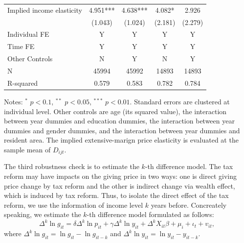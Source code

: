 \documentclass[
  11pt,
  a4paper,
]{article}
\begin{document}
\begin{table}
\begin{threeparttable}
\begin{tabular}[t]{lcccc}
  \hspace{1em}Implied income elasticity & 4.951*** & 4.638*** & 4.082* & 2.926\\
  \hspace{1em} & (1.043) & (1.024) & (2.181) & (2.279)\\
  \hspace{1em}Individual FE & Y & Y & Y & Y\\
  \hspace{1em}Time FE & Y & Y & Y & Y\\
  \hspace{1em}Other Controls & N & Y & N & Y\\
  \hspace{1em}N & 45994 & 45992 & 14893 & 14893\\
  \hspace{1em}R-squared & 0.579 & 0.583 & 0.782 & 0.784\\
  \bottomrule
  \end{tabular}
  \begin{tablenotes}
  \item Notes: $^{*}$ $p < 0.1$, $^{**}$ $p < 0.05$, $^{***}$ $p < 0.01$. Standard errors are clustered at individual level. Other controls are age (its squared value), the interaction between year dummies and education dummies, the interaction between year dummies and gender dummies, and the interaction between year dummies and resident area. The implied extensive-marign price elasticity is evaluated at the sample mean of $D_{ijt}$.
  \end{tablenotes}
  \end{threeparttable}
  \end{table}

  The third robustness check is to estimate the \(k\)-th difference model. The tax reform may have impacts on the giving price in two ways: one is direct giving price change by tax reform and the other is indirect change via wealth effect, which is induced by tax reform. Thus, to isolate the direct effect of the tax reform, we use the information of income level \(k\) years before.
  Concreately speaking, we estimate the \(k\)-th difference model formulated as follows:
  \[
  \Delta^k \ln g_{it} = \delta \Delta^k \ln p_{it} + \gamma \Delta^k \ln y_{it} + \Delta^k X_{it} \beta + \mu_i + \iota_t + v_{it},
  \]
  where \(\Delta^k \ln g_{it} = \ln g_{it} - \ln g_{it-k}\) and \(\Delta^k \ln y_{it} = \ln y_{it} - y_{it-k}\).
\end{document}
